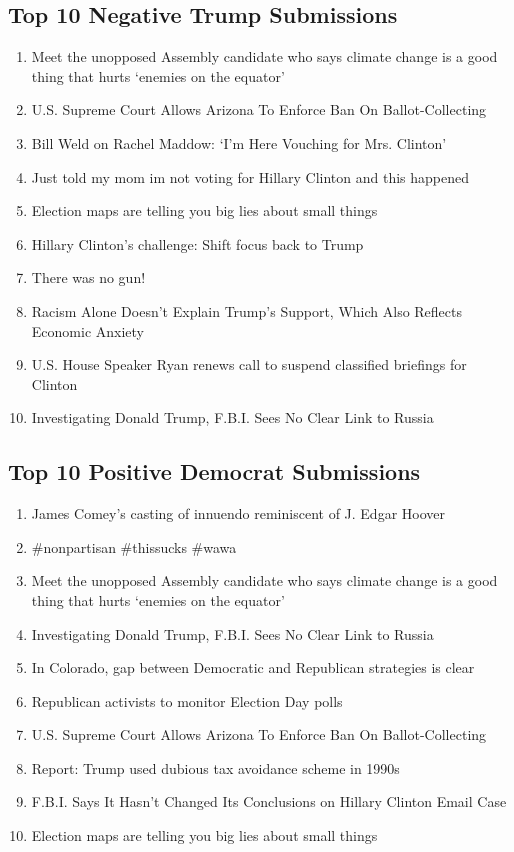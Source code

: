 \documentclass[12pt]{article}
\begin{document}
\subsection{Top 10 Negative Trump Submissions}

{\scriptsize
\begin{enumerate}
        \item Meet the unopposed Assembly candidate who says climate change is a good thing that hurts `enemies on the equator'
        \item U.S. Supreme Court Allows Arizona To Enforce Ban On Ballot-Collecting
        \item Bill Weld on Rachel Maddow: `I'm Here Vouching for Mrs. Clinton'
        \item Just told my mom im not voting for Hillary Clinton and this happened
        \item Election maps are telling you big lies about small things
        \item Hillary Clinton's challenge: Shift focus back to Trump
        \item There was no gun!
        \item Racism Alone Doesn't Explain Trump's Support, Which Also Reflects Economic Anxiety
        \item U.S. House Speaker Ryan renews call to suspend classified briefings for Clinton
        \item Investigating Donald Trump, F.B.I. Sees No Clear Link to Russia
\end{enumerate}
}

\subsection{Top 10 Positive Democrat Submissions}
{\scriptsize
\begin{enumerate}
        \item James Comey's casting of innuendo reminiscent of J. Edgar Hoover
        \item \#nonpartisan \#thissucks \#wawa
        \item Meet the unopposed Assembly candidate who says climate change is a good thing that hurts `enemies on the equator'
        \item Investigating Donald Trump, F.B.I. Sees No Clear Link to Russia
        \item In Colorado, gap between Democratic and Republican strategies is clear
        \item Republican activists to monitor Election Day polls
        \item U.S. Supreme Court Allows Arizona To Enforce Ban On Ballot-Collecting
        \item Report: Trump used dubious tax avoidance scheme in 1990s
        \item F.B.I. Says It Hasn't Changed Its Conclusions on Hillary Clinton Email Case
        \item Election maps are telling you big lies about small things
\end{enumerate}
}
\end{document}

